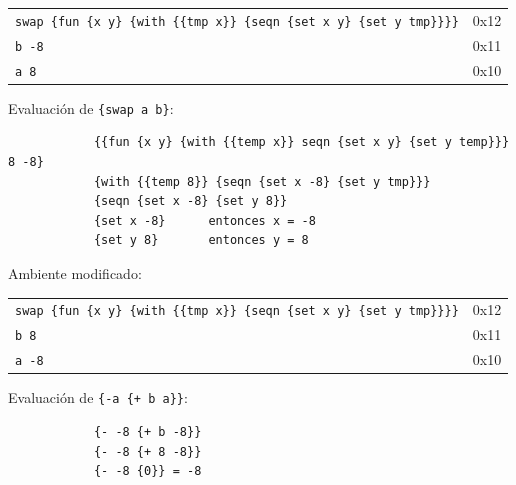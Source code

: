 \documentclass[letterpaper,11pt]{article}
\begin{document}
\begin{enumerate}
\begin{itemize}
\begin{center}
\begin{tabular}{|l| c }
            \cline{1-1}
                \texttt{swap \hspace{1cm} \{fun \{x y\}
                        \{with \{\{tmp x\}\}
                           \{seqn \{set x y\}
                                  \{set y tmp\}\}\}\}} & 0x12\\\cline{1-1}
                \texttt{b \hspace{1.58cm} -8} & 0x11\\\cline{1-1}
                \texttt{a \hspace{1.6cm} 8} & 0x10\\\cline{1-1}
            \end{tabular}
        \end{center}
        Evaluación de \texttt{\{swap a b\}}:        \begin{verbatim}
            {{fun {x y} {with {{temp x}} seqn {set x y} {set y temp}}} 8 -8}
            {with {{temp 8}} {seqn {set x -8} {set y tmp}}}
            {seqn {set x -8} {set y 8}}
            {set x -8}      entonces x = -8
            {set y 8}       entonces y = 8
        \end{verbatim}
        Ambiente modificado:
        \begin{center}
            \begin{tabular}{|l| c }
            \cline{1-1}
                \texttt{swap \hspace{1cm} \{fun \{x y\}
                        \{with \{\{tmp x\}\}
                           \{seqn \{set x y\}
                                  \{set y tmp\}\}\}\}} & 0x12\\\cline{1-1}
                \texttt{b \hspace{1.58cm} 8} & 0x11\\\cline{1-1}
                \texttt{a \hspace{1.6cm} -8} & 0x10\\\cline{1-1}
            \end{tabular}
        \end{center}
        Evaluación de \texttt{\{-a \{+ b a\}\}}:
        \begin{verbatim}
            {- -8 {+ b -8}}
            {- -8 {+ 8 -8}}
            {- -8 {0}} = -8
        \end{verbatim}
    \end{itemize}
    

\end{enumerate}
\end{document}
